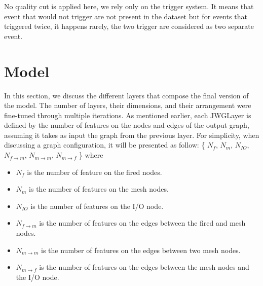 \documentclass[../main.tex]{subfiles}
\begin{document}
No quality cut is applied here, we rely only on the trigger system. It means that event that would not trigger are not present in the dataset but for events that triggered twice, it happens rarely, the two trigger are considered as two separate event.



\section{Model}

In this section, we discuss the different layers that compose the final version of the model. The number of layers, their dimensions, and their arrangement were fine-tuned through multiple iterations. As mentioned earlier, each JWGLayer is defined by the number of features on the nodes and edges of the output graph, assuming it takes as input the graph from the previous layer. For simplicity, when discussing a graph configuration, it will be presented as follow: \{ {\color{red} $N_{f}$},  {\color{Dandelion} $N_{m}$}, {\color{blue} $N_{IO}$}, $N_{f\rightarrow m}$, $N_{m \rightarrow m}$, $N_{m \rightarrow f}$ \} where
\begin{itemize}
  \item {\color{red} $N_{f}$} is the number of feature on the fired nodes.
  \item {\color{Dandelion} $N_{m}$} is the number of features on the mesh nodes.
  \item {\color{blue} $N_{IO}$} is the number of features on the I/O node.
  \item $N_{f\rightarrow m}$ is the number of features on the edges between the fired and mesh nodes.
  \item $N_{m \rightarrow m}$ is the number of features on the edges between two mesh nodes.
  \item $N_{m \rightarrow f}$ is the number of features on the edges between the mesh nodes and the I/O node.
\end{itemize}
\end{document}
